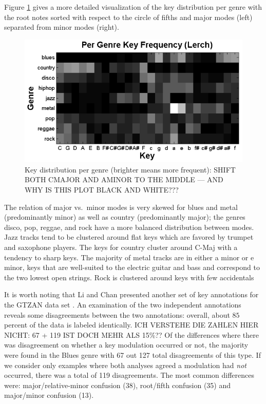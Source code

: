 \documentclass{article}
\begin{document}
Figure \ref{fig:KeyDistributionPerGenre} gives a more detailed visualization of the key distribution per genre with the root notes sorted with respect to the circle of fifths and major modes (left) separated from minor modes (right). 
\begin{figure}
    \includegraphics[scale=.4]{graph/key_distribution}
	\caption{Key distribution per genre (brighter means more frequent): SHIFT BOTH CMAJOR AND AMINOR TO THE MIDDLE --- AND WHY IS THIS PLOT BLACK AND WHITE???}
	\label{fig:KeyDistributionPerGenre}
\end{figure}
The relation of major vs.\ minor modes is very skewed for blues and metal (predominantly minor) as well as country (predominantly major); the genres disco, pop, reggae, and rock have a more balanced distribution between modes. Jazz tracks tend to be clustered around flat keys which are favored by trumpet and saxophone players. The keys for country cluster around C-Maj with a tendency to sharp keys. The majority of metal tracks are in either a minor or e minor, keys that are well-suited to the electric guitar and bass and correspond to the two lowest open strings. Rock is clustered around keys with few accidentals


It is worth noting that Li and Chan presented another set of key annotations for the GTZAN data set \cite{li_genre_2011}. An examination of the two independent annotations reveals some disagreements between the two annotations: overall, about $85$ percent of the data is labeled identically. 
ICH VERSTEHE DIE ZAHLEN HIER NICHT: 67 + 119 IST DOCH MEHR ALS 15\%??
Of the differences where there was disagreement on whether a key modulation occurred or not, the majority were found in the Blues genre with 67 out 127 total disagreements of this type. If we consider only examples where both analyses agreed a modulation had \textit{not} occurred, there was a total of 119 disagreements. The most common differences were: major/relative-minor confusion (38), root/fifth confusion (35) and major/minor confusion (13).
\end{document}
